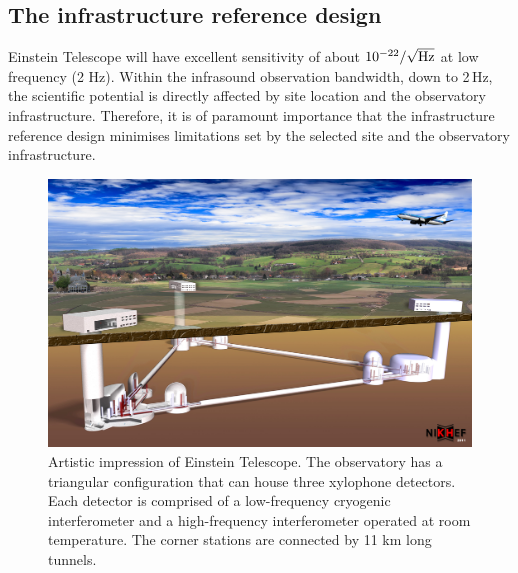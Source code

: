 



\FloatBarrier
\subsection{The infrastructure reference design}
Einstein Telescope will have excellent sensitivity of about $10^{-22}/\sqrt{\rm Hz}$ at low frequency (2 Hz). Within the infrasound observation bandwidth, down to 2\,Hz, the scientific potential is directly affected by site location and the observatory infrastructure. Therefore, it is of paramount importance that the infrastructure reference design minimises limitations set by the selected site and the observatory infrastructure. 
\begin{figure}[h!]
	\centering
		\includegraphics[width=17cm]{./Sec_SiteInfra/Figures/ArtisticView2.jpg}
		\caption{Artistic impression of Einstein Telescope. The observatory has a triangular configuration that can house three xylophone detectors. Each detector is comprised of a low-frequency cryogenic interferometer and a high-frequency interferometer operated at room temperature. The corner stations are connected by 11 km long tunnels.}
		\label{Landscape}
\end{figure}

